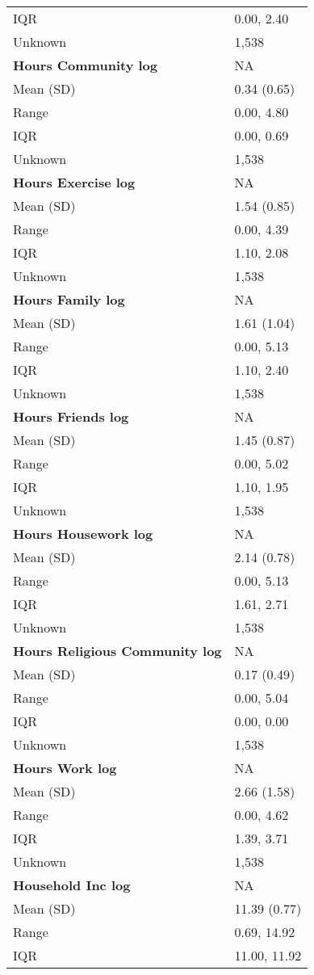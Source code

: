 \documentclass[
  single column]{article}
\begin{document}
\begin{longtable}[]{@{}ll@{}}
IQR & 0.00, 2.40 \\
Unknown & 1,538 \\
\textbf{Hours Community log} & NA \\
Mean (SD) & 0.34 (0.65) \\
Range & 0.00, 4.80 \\
IQR & 0.00, 0.69 \\
Unknown & 1,538 \\
\textbf{Hours Exercise log} & NA \\
Mean (SD) & 1.54 (0.85) \\
Range & 0.00, 4.39 \\
IQR & 1.10, 2.08 \\
Unknown & 1,538 \\
\textbf{Hours Family log} & NA \\
Mean (SD) & 1.61 (1.04) \\
Range & 0.00, 5.13 \\
IQR & 1.10, 2.40 \\
Unknown & 1,538 \\
\textbf{Hours Friends log} & NA \\
Mean (SD) & 1.45 (0.87) \\
Range & 0.00, 5.02 \\
IQR & 1.10, 1.95 \\
Unknown & 1,538 \\
\textbf{Hours Housework log} & NA \\
Mean (SD) & 2.14 (0.78) \\
Range & 0.00, 5.13 \\
IQR & 1.61, 2.71 \\
Unknown & 1,538 \\
\textbf{Hours Religious Community log} & NA \\
Mean (SD) & 0.17 (0.49) \\
Range & 0.00, 5.04 \\
IQR & 0.00, 0.00 \\
Unknown & 1,538 \\
\textbf{Hours Work log} & NA \\
Mean (SD) & 2.66 (1.58) \\
Range & 0.00, 4.62 \\
IQR & 1.39, 3.71 \\
Unknown & 1,538 \\
\textbf{Household Inc log} & NA \\
Mean (SD) & 11.39 (0.77) \\
Range & 0.69, 14.92 \\
IQR & 11.00, 11.92 \\

\end{longtable}
\end{document}
